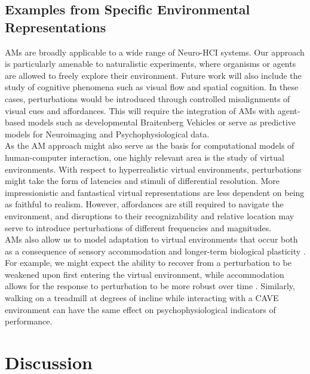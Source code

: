 \documentclass{sigchi}
\begin{document}
\subsection{Examples from Specific Environmental Representations}
AMs are broadly applicable to a wide range of Neuro-HCI systems. Our approach is particularly amenable to naturalistic experiments, where organisms or agents are allowed to freely explore their environment. Future work will also include the study of cognitive phenomena such as visual flow and spatial cognition. In these cases, perturbations would be introduced through controlled misalignments of visual cues and affordances. This will require the integration of AMs with agent-based models such as developmental Braitenberg Vehicles \cite{bradly_categories} or serve as predictive models for Neuroimaging and Psychophysiological data. \\
As the AM approach might also serve as the basis for computational models of human-computer interaction, one highly relevant area is the study of virtual environments. With respect to hyperrealistic virtual environments, perturbations might take the form of latencies and stimuli of differential resolution. More impressionistic and fantastical virtual representations are less dependent on being as faithful to realism. However, affordances are still required to navigate the environment, and disruptions to their recognizability and relative location may serve to introduce perturbations of different frequencies and magnitudes. \\
AMs also allow us to model adaptation to virtual environments that occur both as a consequence of sensory accommodation \cite{redding} and longer-term biological plasticity \cite{kim}. For example, we might expect the ability to recover from a perturbation to be weakened upon first entering the virtual environment, while accommodation allows for the response to perturbation to be more robust over time \cite{redding}. Similarly, walking on a treadmill at degrees of incline while interacting with a CAVE environment \cite{kim} can have the same effect on psychophysiological indicators of performance.  

\section{Discussion}
\end{document}
